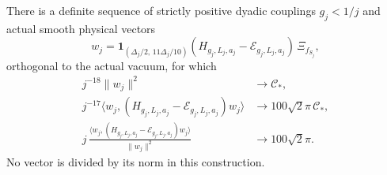 \begin{theorem}\label{thm:low-actual-sequence}
There is a definite sequence of strictly positive dyadic couplings
$g_j<1/j$ and actual smooth physical vectors
\begin{equation}\label{eq:low-actual-vector}
 w_j=\mathbf1_{(\Delta_j/2,\,11\Delta_j/10)}
        (H_{g_j,L_j,a_j}-\mathcal E_{g_j,L_j,a_j})
        \,\Xi_{f_{S_j}},
\end{equation}
orthogonal to the actual vacuum, for which
\begin{align}
 j^{-18}\|w_j\|^2&\longrightarrow\mathcal C_*,
 \label{eq:low-raw-norm}\\
 j^{-17}\langle w_j,(H_{g_j,L_j,a_j}-\mathcal E_{g_j,L_j,a_j})w_j\rangle
 &\longrightarrow100\sqrt2\pi\,\mathcal C_*,
 \label{eq:low-raw-energy}\\
 j\,\frac{\langle w_j,(H_{g_j,L_j,a_j}-\mathcal E_{g_j,L_j,a_j})w_j\rangle}
               {\|w_j\|^2}
 &\longrightarrow100\sqrt2\pi .
 \label{eq:low-quotient}
\end{align}
No vector is divided by its norm in this construction.
\end{theorem}

